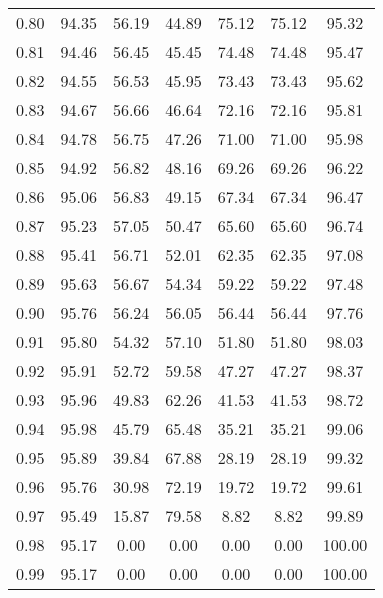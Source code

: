 \begin{tabular}{|c|c|c|c|c|c|c|}
      0.80 &     94.35 &     56.19 &      44.89 &   75.12 &      75.12 &         95.32 \\
      0.81 &     94.46 &     56.45 &      45.45 &   74.48 &      74.48 &         95.47 \\
      0.82 &     94.55 &     56.53 &      45.95 &   73.43 &      73.43 &         95.62 \\
      0.83 &     94.67 &     56.66 &      46.64 &   72.16 &      72.16 &         95.81 \\
      0.84 &     94.78 &     56.75 &      47.26 &   71.00 &      71.00 &         95.98 \\
      0.85 &     94.92 &     56.82 &      48.16 &   69.26 &      69.26 &         96.22 \\
      0.86 &     95.06 &     56.83 &      49.15 &   67.34 &      67.34 &         96.47 \\
      0.87 &     95.23 &     57.05 &      50.47 &   65.60 &      65.60 &         96.74 \\
      0.88 &     95.41 &     56.71 &      52.01 &   62.35 &      62.35 &         97.08 \\
      0.89 &     95.63 &     56.67 &      54.34 &   59.22 &      59.22 &         97.48 \\
      0.90 &     95.76 &     56.24 &      56.05 &   56.44 &      56.44 &         97.76 \\
      0.91 &     95.80 &     54.32 &      57.10 &   51.80 &      51.80 &         98.03 \\
      0.92 &     95.91 &     52.72 &      59.58 &   47.27 &      47.27 &         98.37 \\
      0.93 &     95.96 &     49.83 &      62.26 &   41.53 &      41.53 &         98.72 \\
      0.94 &     95.98 &     45.79 &      65.48 &   35.21 &      35.21 &         99.06 \\
      0.95 &     95.89 &     39.84 &      67.88 &   28.19 &      28.19 &         99.32 \\
      0.96 &     95.76 &     30.98 &      72.19 &   19.72 &      19.72 &         99.61 \\
      0.97 &     95.49 &     15.87 &      79.58 &    8.82 &       8.82 &         99.89 \\
      0.98 &     95.17 &      0.00 &       0.00 &    0.00 &       0.00 &        100.00 \\
      0.99 &     95.17 &      0.00 &       0.00 &    0.00 &       0.00 &        100.00 \\
\bottomrule
\end{tabular}
